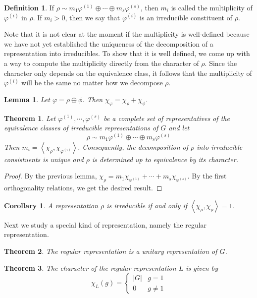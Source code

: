 \documentclass{article}
\newtheorem{Thm}{Theorem}[section]
\newtheorem{corollary}{Corollary}[Thm]
\newtheorem{Lem}{Lemma}[section]
\theoremstyle{definition}
\newtheorem{Def}{Definition}[section]
\begin{document}
\begin{Def}
    If $\rho\sim m_1\varphi^{(1)}\oplus\cdots\oplus m_s\varphi^{(s)}$, then $m_i$ is called the multiplicity of $\varphi^{(i)}$ in $\rho$.
    If $m_i>0$, then we say that $\varphi^{(i)}$ is an irreducible constituent of $\rho$.
\end{Def}
Note that it is not clear at the moment if the multiplicity is well-defined because we have not yet established the uniqueness of the decomposition of a representation into irreducibles.
To show that it is well defined, we come up with a way to compute the multiplicity directly from the character of $\rho$.
Since the character only depends on the equivalence class, it follows that the multiplicity of $\varphi^{(i)}$ will be the same no matter how we decompose $\rho$.
\begin{Lem}
    Let $\varphi=\rho\oplus\phi$. Then $\chi_\varphi=\chi_\rho+\chi_\phi$.
\end{Lem}
\begin{Thm}
    Let $\varphi^{(1)},\cdots,\varphi^{(s)}$ be a complete set of representatives of the equivalence classes of irreducible representations of $G$ and let 
    \[\rho\sim m_1\varphi^{(1)}\oplus \cdots \oplus m_s \varphi^{(s)}\] 
    Then $m_i=\left\langle\chi_\rho,\chi_{\varphi^{(i)}}\right\rangle$. Consequently, the decomposition of $\rho$ into irreducible consistuents is unique and $\rho$ is determined up to equivalence by its character.
\end{Thm}
\begin{proof}
    By the previous lemma, $\chi_\rho=m_1\chi_{\varphi^{(1)}}+\cdots+m_s\chi_{\varphi^{(s)}}$. By the first orthogonality relations, we get the desired result.
\end{proof}
\begin{corollary}
    A representation $\rho$ is irreducible if and only if $\left\langle\chi_\rho,\chi_\rho\right\rangle=1$.
\end{corollary}


Next we study a special kind of representation, namely the regular representation.

\begin{Thm}
    The regular representation is a unitary representation of $G$.
\end{Thm}

\begin{Thm}
    The character of the regular representation $L$ is given by 
    \[\chi_L(g)=\left\{\begin{matrix}
        \left|G\right|  & g=1\\
          0&g\ne 1
        \end{matrix}\right.\]
\end{Thm}
\end{document}
